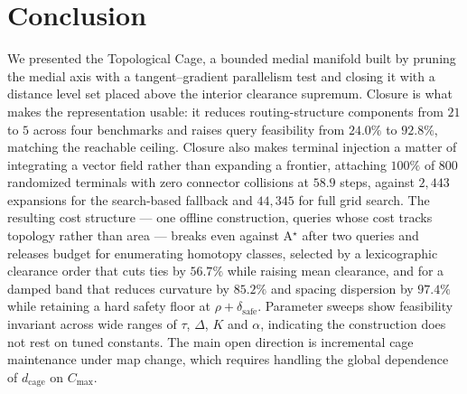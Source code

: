 \documentclass[conference]{IEEEtran}
\begin{document}
\section{Conclusion}
We presented the Topological Cage, a bounded medial manifold built by pruning the medial axis with a tangent--gradient parallelism test and closing it with a distance level set placed above the interior clearance supremum. Closure is what makes the representation usable: it reduces routing-structure components from $21$ to $5$ across four benchmarks and raises query feasibility from $24.0\%$ to $92.8\%$, matching the reachable ceiling. Closure also makes terminal injection a matter of integrating a vector field rather than expanding a frontier, attaching $100\%$ of $800$ randomized terminals with zero connector collisions at $58.9$ steps, against $2{,}443$ expansions for the search-based fallback and $44{,}345$ for full grid search. The resulting cost structure --- one offline construction, queries whose cost tracks topology rather than area --- breaks even against A$^\star$ after two queries and releases budget for enumerating homotopy classes, selected by a lexicographic clearance order that cuts ties by $56.7\%$ while raising mean clearance, and for a damped band that reduces curvature by $85.2\%$ and spacing dispersion by $97.4\%$ while retaining a hard safety floor at $\rho+\delta_{\mathrm{safe}}$. Parameter sweeps show feasibility invariant across wide ranges of $\tau$, $\Delta$, $K$ and $\alpha$, indicating the construction does not rest on tuned constants. The main open direction is incremental cage maintenance under map change, which requires handling the global dependence of $d_{\mathrm{cage}}$ on $C_{\max}$.
\appendices
\end{document}
